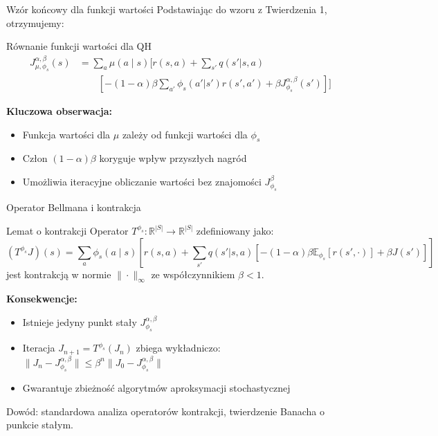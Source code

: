 \begin{frame}{Wzór końcowy dla funkcji wartości}
Podstawiając do wzoru z Twierdzenia 1, otrzymujemy:

\begin{block}{Równanie funkcji wartości dla QH}
\begin{align*}
J^{\alpha, \beta}_{\mu, \phi_s}(s) &= \sum_a \mu(a\mid s) \Bigg[ r(s, a) + \sum_{s'} q(s'|s, a) \\
&\qquad \left[ -(1 - \alpha)\beta \sum_{a'} \phi_s(a'|s') r(s', a') + \beta J^{\alpha, \beta}_{\phi_s}(s') \right] \Bigg]
\end{align*}
\end{block}

\vspace{0.5em}
\textbf{Kluczowa obserwacja:}
\begin{itemize}
    \item Funkcja wartości dla $\mu$ zależy od funkcji wartości dla $\phi_s$
    \item Człon $(1-\alpha)\beta$ koryguje wpływ przyszłych nagród
    \item Umożliwia iteracyjne obliczanie wartości bez znajomości $J^{\beta}_{\phi_s}$
\end{itemize}
\end{frame}

\begin{frame}{Operator Bellmana i kontrakcja}
\begin{block}{Lemat o kontrakcji \cite{puterman2014,Kallenberg2022}}
Operator $T^{\phi_s}: \mathbb{R}^{|S|} \to \mathbb{R}^{|S|}$ zdefiniowany jako:
\[
(T^{\phi_s} J)(s) = \sum_a \phi_s(a\mid s) \left[ r(s, a) + \sum_{s'} q(s'|s, a) \left[ -(1 - \alpha)\beta \mathbb{E}_{\phi_s}[r(s', \cdot)] + \beta J(s') \right] \right]
\]
jest kontrakcją w normie $\|\cdot\|_\infty$ ze współczynnikiem $\beta < 1$.
\end{block}

\vspace{0.5em}
\textbf{Konsekwencje:}
\begin{itemize}
    \item Istnieje jedyny punkt stały $J^{\alpha, \beta}_{\phi_s}$
    \item Iteracja $J_{n+1} = T^{\phi_s}(J_n)$ zbiega wykładniczo: $\|J_n - J^{\alpha, \beta}_{\phi_s}\| \leq \beta^n \|J_0 - J^{\alpha, \beta}_{\phi_s}\|$
    \item Gwarantuje zbieżność algorytmów aproksymacji stochastycznej
\end{itemize}

{\small Dowód: standardowa analiza operatorów kontrakcji, twierdzenie Banacha o punkcie stałym.}
\end{frame}

